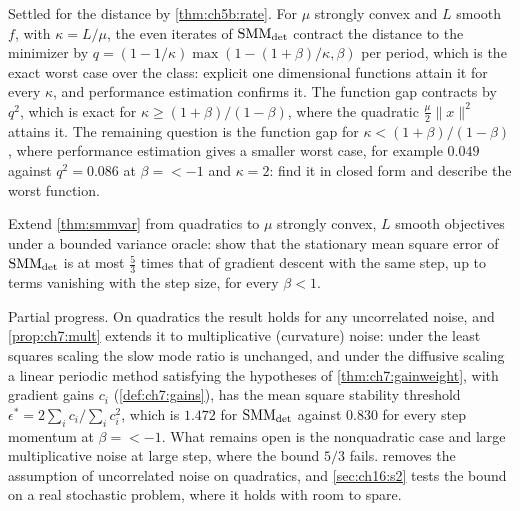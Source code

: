 \begin{problem*}\label{prob:ch11:s1}
Settled for the distance by \cref{thm:ch5b:rate}. For $\mu$ strongly convex and $L$ smooth $f$, with $\kappa=L/\mu$, the even iterates of $\mathrm{SMM}_{\mathrm{det}}$ contract the distance to the minimizer by $q=(1-1/\kappa)\max(1-(1+\beta)/\kappa,\beta)$ per period, which is the exact worst case over the class: explicit one dimensional functions attain it for every $\kappa$, and performance estimation confirms it. The function gap contracts by $q^2$, which is exact for $\kappa\ge(1+\beta)/(1-\beta)$, where the quadratic $\frac\mu2\|x\|^2$ attains it. The remaining question is the function gap for $\kappa<(1+\beta)/(1-\beta)$, where performance estimation gives a smaller worst case, for example $0.049$ against $q^2=0.086$ at $\beta=\lt-1$ and $\kappa=2$: find it in closed form and describe the worst function.
\end{problem*}

\begin{problem*}\label{prob:ch11:s2}
Extend \cref{thm:smmvar} from quadratics to $\mu$ strongly convex, $L$ smooth objectives under
a bounded variance oracle: show that the stationary mean square error of
$\mathrm{SMM}_{\mathrm{det}}$ is at most $\tfrac53$ times that of gradient descent with the same
step, up to terms vanishing with the step size, for every $\beta<1$.
\end{problem*}

Partial progress. On quadratics the result holds for any uncorrelated noise,
and \cref{prop:ch7:mult} extends it to multiplicative (curvature) noise: under
the least squares scaling the slow mode ratio is unchanged, and under the
diffusive scaling a linear periodic method satisfying the hypotheses of \cref{thm:ch7:gainweight}, with gradient gains $c_i$ (\cref{def:ch7:gains}), has the mean square stability threshold $\epsilon^*=2\sum_ic_i/\sum_ic_i^2$, which is $1.472$ for $\mathrm{SMM}_{\mathrm{det}}$ against
$0.830$ for every step momentum at $\beta=\lt-1$. What remains open is the
nonquadratic case and large multiplicative noise at large step, where the
bound $5/3$ fails.
 removes the assumption of uncorrelated noise on
quadratics, and \cref{sec:ch16:s2} tests the bound on a real stochastic problem,
where it holds with room to spare.

